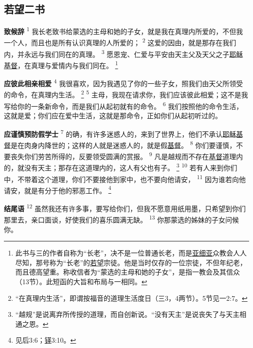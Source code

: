 \setlength\columnsep{0.6cm}
\begin{multicols}{2}

\chapter*{若望二书}


\textbf{致候辞\quad}
\textsuperscript{1}
我长老致书给蒙选的主母和她的子女，就是我在真理内所爱的，不但我一个人，而且也是所有认识真理的人所爱的；
\textsuperscript{2}
这爱的因由，就是那存在我们内，并永远与我们同在的真理。
\textsuperscript{3}
愿恩宠、仁爱与平安由天主父及天父之子\uline{耶稣}\uline{基督}，在真理与爱情内与我们同在。
\renewcommand\thefootnote{\ding{\numexpr171+\value{footnote}}}
\footnote{此书与三的作者自称为“长老”，决不是一位普通长老，而是\uline{亚细亚}众教会人人尽知，那号称为“长老”的\uline{若望}宗徒。他是当时仅存的一位宗徒，不但年纪老，而且德高望重。称收信者为“蒙选的主母和她的子女”，是指一教会及其信众（13节）。此短函的大旨和布局与一相同。}

\textbf{应彼此相亲相爱\quad}
\textsuperscript{4}
我很喜欢，因为我遇见了你的一些子女，照我们由天父所领受的命令，在真理内生活。
\footnote{“在真理内生活”，即谓按福音的道理生活度日（三3，4两节）。5节见一2:7。}
\textsuperscript{5}
主母，我现在请求你，我们应该彼此相爱；这不是我写给你的一条新命令，而是我们从起初就有的命令。
\textsuperscript{6}
我们按照他的命令生活，这就是爱；你们应在爱中生活，这就是那命令，正如你们从起初听过的。

\textbf{应谨慎预防假学士\quad}
\textsuperscript{7}
的确，有许多迷惑人的，来到了世界上，他们不承认\uline{耶稣}\uline{基督}是在肉身内降世的；这样的人就是迷惑人的，就是假\uline{基督}。
\textsuperscript{8}
你们要谨慎，不要丧失你们劳苦所得的，反要领受圆满的赏报。
\textsuperscript{9}
凡是越规而不存在\uline{基督}道理内的，就没有天主；那存在这道理内的，这人有父也有子。
\footnote{“越规”是说离弃所传授的道理，而自创新说。“没有天主”是说丧失了与天主相通之恩。}
\textsuperscript{10}
若有人来到你们中，不带着这个道理，你们不要接他到家中，也不要向他请安，
\textsuperscript{11}
因为谁若向他请安，就是有分于他的邪恶工作。
\footnote{见后3:6；\uline{铎}3:10。}

\textbf{结尾语\quad}
\textsuperscript{12}
虽然我还有许多事，要写给你们，但我不愿意用纸用墨，只希望到你们那里去，亲口面谈，好使我们的喜乐圆满无缺。
\textsuperscript{13}
你那蒙选的姊妹的子女问候你。

\end{multicols}
